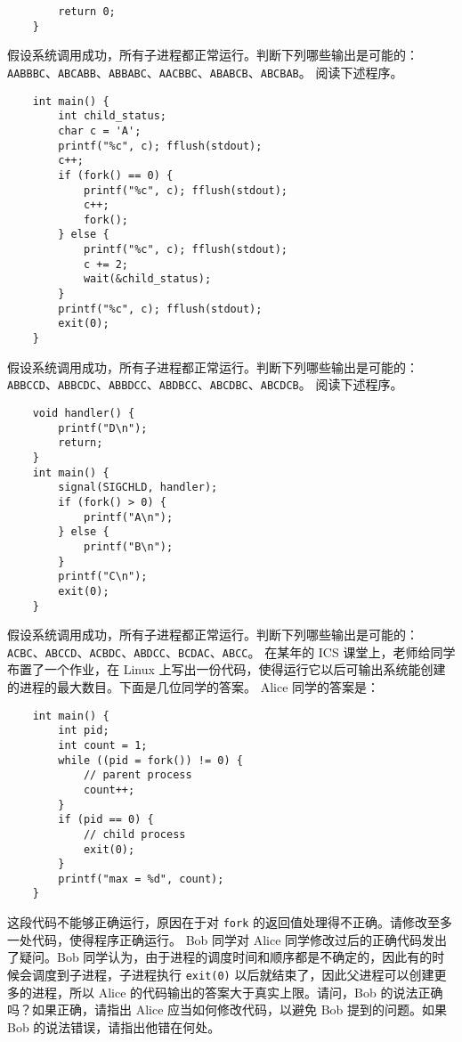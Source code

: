 \begin{problems}
\begin{verbatim}
        return 0;
    }
        \end{verbatim}
        假设系统调用成功，所有子进程都正常运行。判断下列哪些输出是可能的：\verb|AABBBC|、\verb|ABCABB|、\verb|ABBABC|、\verb|AACBBC|、\verb|ABABCB|、\verb|ABCBAB|。
        \pro 阅读下述程序。
        \begin{verbatim}
    int main() {
        int child_status;
        char c = 'A';
        printf("%c", c); fflush(stdout);
        c++;
        if (fork() == 0) {
            printf("%c", c); fflush(stdout);
            c++;
            fork();
        } else {
            printf("%c", c); fflush(stdout);
            c += 2;
            wait(&child_status);
        } 
        printf("%c", c); fflush(stdout);
        exit(0);
    }
        \end{verbatim}
        假设系统调用成功，所有子进程都正常运行。判断下列哪些输出是可能的：\verb|ABBCCD|、\verb|ABBCDC|、\verb|ABBDCC|、\verb|ABDBCC|、\verb|ABCDBC|、\verb|ABCDCB|。
        \pro 阅读下述程序。
        \begin{verbatim}
    void handler() {
        printf("D\n");
        return;
    }
    int main() {
        signal(SIGCHLD, handler);
        if (fork() > 0) {
            printf("A\n");
        } else {
            printf("B\n");
        } 
        printf("C\n");
        exit(0);
    }
        \end{verbatim}
        假设系统调用成功，所有子进程都正常运行。判断下列哪些输出是可能的：\verb|ACBC|、\verb|ABCCD|、\verb|ACBDC|、\verb|ABDCC|、\verb|BCDAC|、\verb|ABCC|。
        \pro 在某年的 ICS 课堂上，老师给同学布置了一个作业，在 Linux 上写出一份代码，使得运行它以后可输出系统能创建的进程的最大数目。下面是几位同学的答案。
            \qn Alice 同学的答案是：
            \begin{verbatim}
    int main() {
        int pid;
        int count = 1;
        while ((pid = fork()) != 0) {
            // parent process
            count++;
        } 
        if (pid == 0) {
            // child process
            exit(0);
        } 
        printf("max = %d", count);
    }
            \end{verbatim}
            这段代码不能够正确运行，原因在于对 \verb|fork| 的返回值处理得不正确。请修改至多一处代码，使得程序正确运行。
            \qn Bob 同学对 Alice 同学修改过后的正确代码发出了疑问。Bob 同学认为，由于进程的调度时间和顺序都是不确定的，因此有的时候会调度到子进程，子进程执行 \verb|exit(0)| 以后就结束了，因此父进程可以创建更多的进程，所以 Alice 的代码输出的答案大于真实上限。请问，Bob 的说法正确吗？如果正确，请指出 Alice 应当如何修改代码，以避免 Bob 提到的问题。如果 Bob 的说法错误，请指出他错在何处。

\end{problems}
